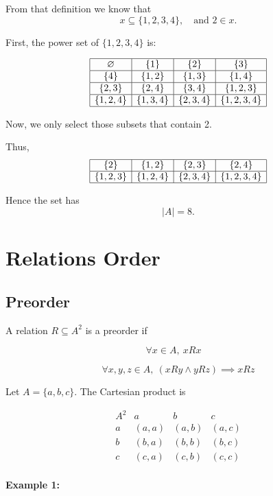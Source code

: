\documentclass[12pt,a4paper,openany]{article}
\begin{document}
From that definition we know that  
\[
x \subseteq \{1,2,3,4\}, \quad \text{and } 2 \in x.
\]  

First, the power set of $\{1,2,3,4\}$ is:

\[
\begin{array}{|c|c|c|c|}
\hline
\varnothing & \{1\} & \{2\} & \{3\} \\ \hline
\{4\} & \{1,2\} & \{1,3\} & \{1,4\} \\ \hline
\{2,3\} & \{2,4\} & \{3,4\} & \{1,2,3\} \\ \hline
\{1,2,4\} & \{1,3,4\} & \{2,3,4\} & \{1,2,3,4\} \\ \hline
\end{array}
\]

Now, we only select those subsets that contain 2.  

Thus,  
\[
\begin{array}{|c|c|c|c|}
\hline
\{2\} & \{1,2\} & \{2,3\} & \{2,4\} \\ \hline
\{1,2,3\} & \{1,2,4\} & \{2,3,4\} & \{1,2,3,4\} \\ \hline
\end{array}
\]

Hence the set has  
\[
\boxed{|A| = 8.}
\]

\section{Relations Order}

\subsection{Preorder}

A relation $R \subseteq A^2$ is a preorder if

$$
\forall x \in A, \ xRx \quad
$$

$$
\forall x,y,z \in A, \ (xRy \land yRz) \implies xRz
$$

Let $A = \{a,b,c\}$. The Cartesian product is

$$
\begin{array}{c|ccc}
A^2 & a & b & c \\
\hline
a & (a,a) & (a,b) & (a,c) \\
b & (b,a) & (b,b) & (b,c) \\
c & (c,a) & (c,b) & (c,c) \\
\end{array}
$$

\textbf{Example 1:}
\end{document}
